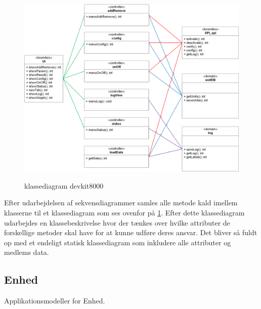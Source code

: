 \clearpage
\begin{figure}[htbp] \centering
{\includegraphics[scale=1]{filer/design/sw_class_devkit}}
\caption{klassediagram devkit8000}
\label{fig:klassediagram devkit8000}
\end{figure} 

Efter udarbejdelsen af sekvensdiagrammer samles alle metode kald imellem klasserne til et klassediagram som ses ovenfor på \ref{fig:klassediagram devkit8000}. Efter dette klassediagram udarbejdes en klassebeskrivelse hvor der tænkes over hvilke attributer de forskellige metoder skal have for at kunne udføre deres ansvar. Det bliver så fuldt op med et endeligt statisk klassediagram som inkludere alle attributer og medlems data.


\clearpage
\subsection{Enhed}
Applikationsmodeller for Enhed.